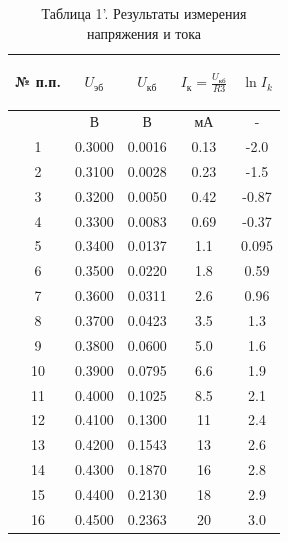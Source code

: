 \begin{center}
\begin{table}[H]
\centering
\caption*{Таблица 1'. Результаты измерения напряжения и тока}
\label{tabl:2}
\begin{tabular}{|c|c|c|c|c|}
\hline
\begin{minipage}{7mm}
    № п.п. 
\end{minipage}&
\begin{minipage}{3.8cm}
   \begin{center}
   $U_{\text{эб}}$
   \end{center}
\end{minipage} &
\begin{minipage}{3.8cm}
   \begin{center}
   $U_{\text{кб}}$
   \end{center}
\end{minipage} &
\begin{minipage}{3.8cm}
    \begin{center}
    $I_{\text{к}}=\frac{U_{\text{кб}}}{R3}$
    \end{center}
\end{minipage}&
\begin{minipage}{3.8cm}
   \begin{center}
   $\ln I_k$
   \end{center}
\end{minipage}\\
\hline
{}&В&В&мА&-\\
\hline
1  & 0.3000 & 0.0016 & 0.13 & -2.0  \\
2  & 0.3100 & 0.0028 & 0.23 & -1.5  \\
3  & 0.3200 & 0.0050 & 0.42 & -0.87 \\
4  & 0.3300 & 0.0083 & 0.69 & -0.37 \\
5  & 0.3400 & 0.0137 & 1.1  & 0.095 \\
6  & 0.3500 & 0.0220 & 1.8  & 0.59  \\
7  & 0.3600 & 0.0311 & 2.6  & 0.96  \\
8  & 0.3700 & 0.0423 & 3.5  & 1.3   \\
9  & 0.3800 & 0.0600 & 5.0  & 1.6   \\
10 & 0.3900 & 0.0795 & 6.6  & 1.9   \\
11 & 0.4000 & 0.1025 & 8.5  & 2.1   \\
12 & 0.4100 & 0.1300 & 11   & 2.4   \\
13 & 0.4200 & 0.1543 & 13   & 2.6   \\
14 & 0.4300 & 0.1870 & 16   & 2.8   \\
15 & 0.4400 & 0.2130 & 18   & 2.9   \\
16 & 0.4500 & 0.2363 & 20   & 3.0   \\
\hline
\end{tabular}
\end{table}
\end{center}

